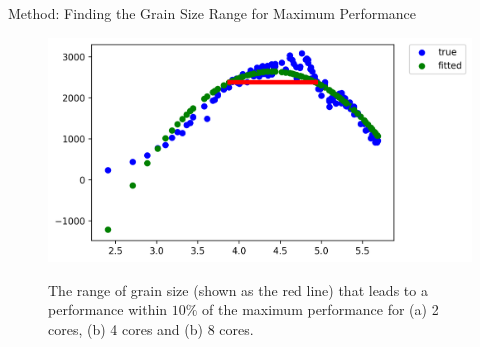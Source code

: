\documentclass[10pt]{beamer}
\begin{document}
\begin{frame}{Method: Finding the Grain Size Range for Maximum Performance}
	\begin{outline}
\begin{figure}[H]
	\centering
	{\includegraphics[scale=.3]{images/polyfit/fig_690_total_4_range.png}\label{fig12:b}}
	\caption{The range of grain size (shown as the red line) that leads to a performance within $10\%$ of the maximum performance for (a) 2 cores, (b) 4 cores and (b) 8 cores.}	
	\label{fig12}
\end{figure}
	\end{outline}
\end{frame}
\end{document}
